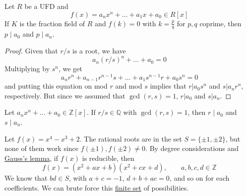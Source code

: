   \begin{theorem}
    \label{thm:rational-root-theorem-for-ufds}
    Let $R$ be a UFD and 
    \begin{equation}
      f(x) = a_n x^n + \ldots + a_1 x + a_0 \in R[x] 
    \end{equation}
    If $K$ is the fraction field of $R$ and $f(k) = 0$ with $k = \frac{p}{q}$ for $p, q$ coprime, then $p \mid a_0$ and $p \mid a_n$. 
  \end{theorem}
  \begin{proof}
    Given that $r/s$ is a root, we have 
    \begin{equation}
      a_n (r/s)^n + \ldots + a_0 = 0
    \end{equation}
    Multiplying by $s^n$, we get 
    \begin{equation}
      a_n r^n + a_{n-1} r^{n-1} s + \ldots + a_1 s^{n-1} r + a_0 s^n = 0
    \end{equation}
    and putting this equation on mod $r$ and mod $s$ implies that $r | a_0 s^n$ and $s | a_n r^n$, respectively. But since we assumed that $\gcd (r, s) = 1$, $r | a_0$ and $s | a_n$. 
  \end{proof}

  \begin{corollary}
    \label{thm:rational-root-theorem-for-integers}
    Let $a_n x^n + \ldots + a_0 \in \mathbb{Z}[x]$. If $r/s \in \mathbb{Q}$ with $\gcd(r, s) = 1$, then $r \mid a_0$ and $s \mid a_n$. 
  \end{corollary}

  \begin{example}
    \label{ex:reducibility-of-integer-polynomials}
    Let $f(x) = x^4 - x^3 + 2$. The rational roots are in the set $S = \{\pm 1, \pm2 \}$, but none of them work since $f(\pm1), f(\pm2) \neq 0$. By degree considerations and \hyperref[thm:gausss-lemma]{Gauss's lemma}, if $f(x)$ is reducible, then 
    \begin{equation}
      f(x) = (x^2 + ax + b) (x^2 + cx + d), \qquad a, b, c, d \in \mathbb{Z}
    \end{equation}
    We know that $bd \in S$, with $a + c = -1$, $d + b + ac = 0$, and so on for each coefficients. We can brute force this \hyperref[st-def:finite-set]{finite set} of possibilities. 
  \end{example}

